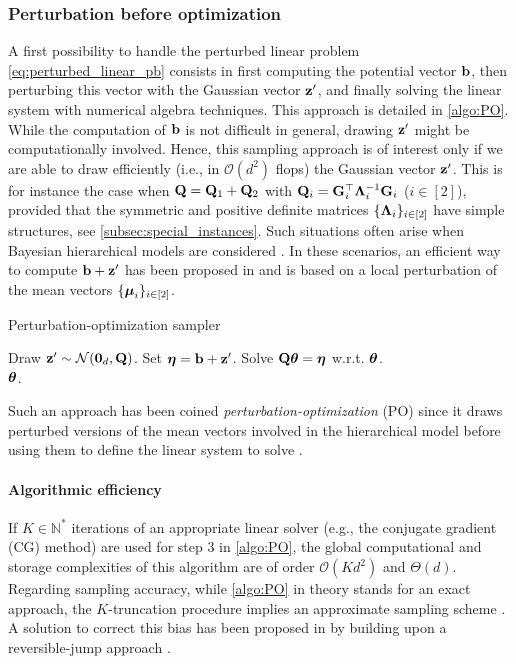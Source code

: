 \documentclass[nohypdvips,onefignum,onetabnum]{siamart171218}
\begin{document}
\subsubsection{Perturbation before optimization}
A first possibility to handle the perturbed linear problem \cref{eq:perturbed_linear_pb} consists in first computing the potential vector $\mathbf{b}$, then perturbing this vector with the Gaussian vector $\mathbf{z}'$, and finally solving the linear system with numerical algebra techniques. 
This approach is detailed in \cref{algo:PO}.
While the computation of $\mathbf{b}$ is not difficult in general, drawing $\mathbf{z}'$ might be computationally involved.
Hence, this sampling approach is of interest only if we are able to draw efficiently (i.e., in $\mathcal{O}(d^2)$ flops) the Gaussian vector $\mathbf{z}'$.
This is for instance the case when $\mathbf{Q} = \mathbf{Q}_1 + \mathbf{Q}_2$ with $\mathbf{Q}_i = \mathbf{G}_i^{\top}\mathbf{\Lambda}_i^{-1}\mathbf{G}_i$ ($i \in [2]$), provided that the symmetric and positive definite matrices $\{\mathbf{\Lambda}_i\}_{i \in [2]}$ have simple structures, see \cref{subsec:special_instances}. 
Such situations often arise when Bayesian hierarchical models are considered \cite[Chap. 10]{Robert94}.
In these scenarios, an efficient way to compute $\mathbf{b} + \mathbf{z}'$ has been proposed in \cite{Papandreou2011} and is based on a local perturbation of the mean vectors $\{\boldsymbol{\mu}_i\}_{i \in [2]}$.
%
\begin{algorithm}
\caption{Perturbation-optimization sampler}
\label{algo:PO}
\begin{algorithmic}[1]
\State Draw $\mathbf{z}' \sim \mathcal{N}(\mathbf{0}_d,\mathbf{Q})$.
\State Set $\boldsymbol{\eta} = \mathbf{b} + \mathbf{z}'$. 
\State Solve $\mathbf{Q}\boldsymbol{\theta} = \boldsymbol{\eta}$ w.r.t. $\boldsymbol{\theta}$. \\
\Return $\boldsymbol{\theta}$.
\end{algorithmic}
\end{algorithm}
Such an approach has been coined \textit{perturbation-optimization} (PO) since it draws perturbed versions of the mean vectors involved in the hierarchical model before using them to define the linear system to solve \cite{Papandreou2011}.

\paragraph{Algorithmic efficiency}
If $K \in \mathbb{N}^*$ iterations of an appropriate linear solver (e.g., the conjugate gradient (CG) method) are used for step 3 in \cref{algo:PO}, the global computational and storage complexities of this algorithm are of order $\mathcal{O}(Kd^2)$ and $\Theta(d)$.
Regarding sampling accuracy, while \cref{algo:PO} in theory stands for an exact approach, the $K$-truncation procedure implies an approximate sampling scheme \cite{Orieux2012}.
A solution to correct this bias has been proposed in \cite{Gilavert2015} by building upon a reversible-jump approach \cite{Green1995}.
\end{document}
